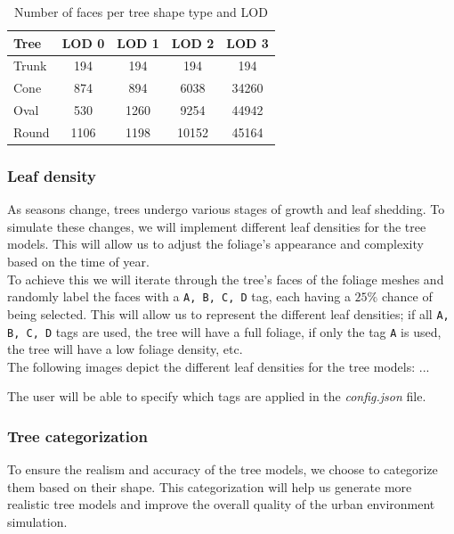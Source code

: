 \documentclass[12pt]{article}
\begin{document}
\begin{table}[H]
    \centering
    \begin{tabular}{|l|c|c|c|c|}
    \hline
    Tree & LOD 0 & LOD 1 & LOD 2 & LOD 3 \\
    \hline
    Trunk & 194 & 194 & 194 & 194 \\
    Cone & 874 & 894 & 6038 & 34260 \\
    Oval & 530 & 1260 & 9254 & 44942 \\
    Round & 1106 & 1198 & 10152 & 45164 \\
    \hline
    \end{tabular}
    \caption{Number of faces per tree shape type and LOD}
    \label{tab:my_label2}
\end{table}

\subsubsection{Leaf density}

As seasons change, trees undergo various stages of growth and leaf shedding.
To simulate these changes, we will implement different leaf densities for the
tree models. This will allow us to adjust the foliage's appearance and
complexity based on the time of year.\\

To achieve this we will iterate through the tree's faces of the foliage meshes 
and randomly label the faces with a \texttt{A, B, C, D} tag, each having a 
$25\%$ chance of being selected. This will allow us to represent the different
leaf densities; if all \texttt{A, B, C, D} tags are used, the tree will have
a full foliage, if only the tag \texttt{A} is used, the tree will have a low
foliage density, etc.\\

The following images depict the different leaf densities for the tree models:
...

The user will be able to specify which tags are applied in the \textit{config.json} 
file.

\subsubsection{Tree categorization}

To ensure the realism and accuracy of the tree models, we choose to categorize
them based on their shape. This categorization will help us
generate more realistic tree models and improve the overall quality of the
urban environment simulation. \\
\end{document}
